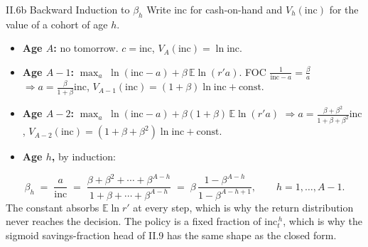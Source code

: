 \documentclass[aspectratio=169,11pt]{beamer}
\begin{document}
\begin{frame}{II.6b Backward Induction to $\beta_h$}
\small
Write $\text{inc}$ for cash-on-hand and $V_h(\text{inc})$ for the value of a cohort of age $h$.
\begin{itemize}\itemsep4pt
    \item \textbf{Age $A$:} no tomorrow. $c = \text{inc}$, \; $V_A(\text{inc}) = \ln \text{inc}$.
    \item \textbf{Age $A-1$:} $\max_a\;\ln(\text{inc}-a) + \beta\,\mathbb{E}\ln(r'a)$. FOC $\tfrac{1}{\text{inc}-a}=\tfrac{\beta}{a}$
          $\Rightarrow a = \tfrac{\beta}{1+\beta}\text{inc}$, \; $V_{A-1}(\text{inc}) = (1+\beta)\ln \text{inc} + \text{const}$.
    \item \textbf{Age $A-2$:} $\max_a\;\ln(\text{inc}-a) + \beta(1+\beta)\,\mathbb{E}\ln(r'a)$
          $\Rightarrow a = \tfrac{\beta+\beta^2}{1+\beta+\beta^2}\text{inc}$, \; $V_{A-2}(\text{inc}) = (1+\beta+\beta^2)\ln \text{inc} + \text{const}$.
    \item \textbf{Age $h$,} by induction:
\end{itemize}
\[
\boxed{\;\beta_h \;=\; \frac{a}{\text{inc}} \;=\; \frac{\beta+\beta^2+\cdots+\beta^{A-h}}{1+\beta+\cdots+\beta^{A-h}}
\;=\; \beta\,\frac{1-\beta^{A-h}}{1-\beta^{A-h+1}},\qquad h=1,\ldots,A-1.\;}
\]
\vspace{0.2em}
{\footnotesize The constant absorbs $\mathbb{E}\ln r'$ at every step, which is why the return distribution never reaches the decision. The policy is a fixed fraction of $\text{inc}_t^{\,h}$, which is why the sigmoid savings-fraction head of II.9 has the same shape as the closed form.}
\end{frame}
\end{document}
